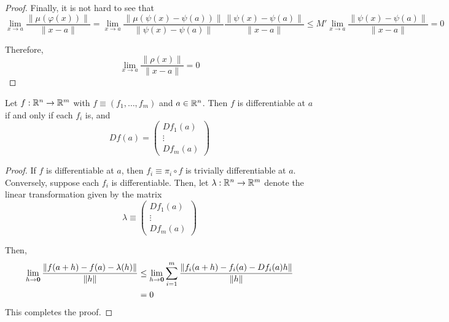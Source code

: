 \begin{proof}
    Finally, it is not hard to see that 
    \begin{equation*}
        \lim_{x\to a}\frac{\|\mu(\varphi(x))\|}{\|x - a\|} = \lim_{x\to a}\frac{\|\mu(\psi(x)-\psi(a))\|}{\|\psi(x) - \psi(a)\|}\frac{\|\psi(x) - \psi(a)\|}{\|x - a\|}\le M'\lim_{x\to a}\frac{\|\psi(x) - \psi(a)\|}{\|x - a\|} = 0
    \end{equation*}

    Therefore, 
    \begin{equation*}
        \lim_{x\to a}\frac{\|\rho(x)\|}{\|x - a\|} = 0
    \end{equation*}
\end{proof}

\begin{proposition}
    Let $f:\mathbb{R}^n\to\mathbb{R}^m$ with $f\equiv(f_1,\ldots,f_m)$ and $a\in\mathbb{R}^n$. Then $f$ is differentiable at $a$ if and only if each $f_i$ is, and 
    \begin{equation*}
        Df(a) = 
        \begin{pmatrix}
            Df_1(a)\\\vdots\\Df_m(a)
        \end{pmatrix}
    \end{equation*}
\end{proposition}
\begin{proof}
    If $f$ is differentiable at $a$, then $f_i\equiv\pi_i\circ f$ is trivially differentiable at $a$. Conversely, suppose each $f_i$ is differentiable. Then, let $\lambda:\mathbb{R}^n\to\mathbb{R}^m$ denote the linear transformation given by the matrix 
    \begin{equation*}
        \lambda \equiv 
        \begin{pmatrix}
            Df_1(a)\\\vdots\\ Df_m(a)
        \end{pmatrix}
    \end{equation*}

    Then, 
    \begin{align*}
        \lim_{h\to\mathbf{0}}\frac{\|f(a + h) - f(a) - \lambda(h)\|}{\|h\|} &\le\lim_{h\to\mathbf{0}}\sum_{i = 1}^m\frac{\|f_i(a + h) - f_i(a) - Df_i(a)h\|}{\|h\|}\\
        &= 0
    \end{align*}
    This completes the proof.
\end{proof}

